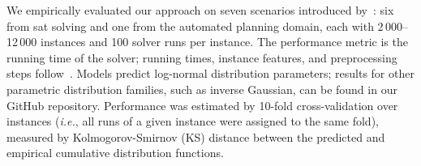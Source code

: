 We empirically evaluated our approach on seven scenarios introduced by~\citet{EggEtAl18}: six from \gls{sat} solving and one from the automated planning domain, each with 2\,000--12\,000 instances and 100 solver runs per instance.
The performance metric is the running time of the solver; running times, instance features, and preprocessing steps follow~\citet{EggEtAl18}.
Models predict log-normal distribution parameters;
results for other parametric distribution families, such as inverse Gaussian, can be found in our GitHub repository.
Performance was estimated by 10-fold cross-validation over instances (\emph{i.e.}, all runs of a given instance were assigned to the same fold), measured by Kolmogorov-Smirnov (KS) distance between the predicted and empirical cumulative distribution functions. 

